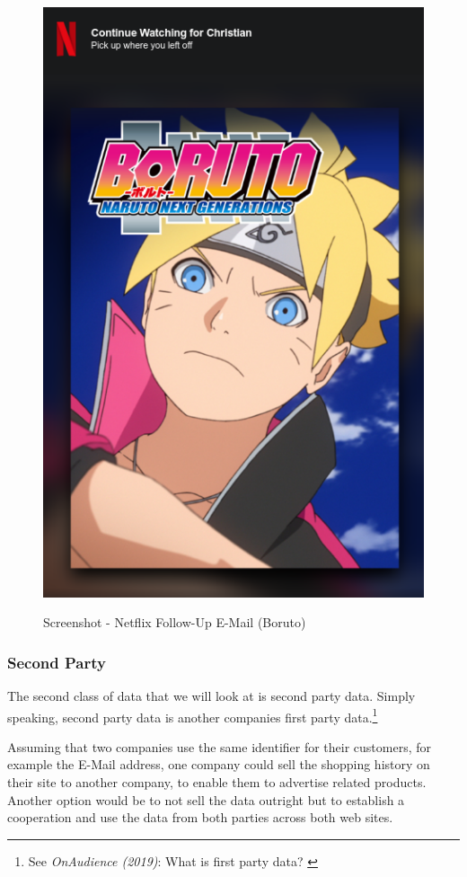 \begin{figure}[H]
\centering
\caption {Screenshot - Netflix Follow-Up E-Mail (Boruto)}
\includegraphics[scale=0.6]{images/continue-boruto.png}
\label{fig:boruto}
\end{figure}

\subsubsection{Second Party}

The second class of data that we will look at is second party data. Simply speaking, second party data is another companies first party data.\footnote{See \textit{OnAudience (2019)}: What is first party data? \cite{firstParty}}

Assuming that two companies use the same identifier for their customers, for example the E-Mail address, one company could sell the shopping history on their site to another company, to enable them to advertise related products. Another option would be to not sell the data outright but to establish a cooperation and use the data from both parties across both web sites.


